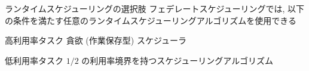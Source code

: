 \begin{frame}{ランタイムスケジューリングの選択肢}
    フェデレートスケジューリングでは, 以下の条件を満たす任意のランタイムスケジューリングアルゴリズムを使用できる
    \begin{block}{高利用率タスク}
        貪欲 (作業保存型) スケジューラ
    \end{block}
    \begin{block}{低利用率タスク}
        $1 / 2$ の利用率境界を持つスケジューリングアルゴリズム
    \end{block}
\end{frame}
